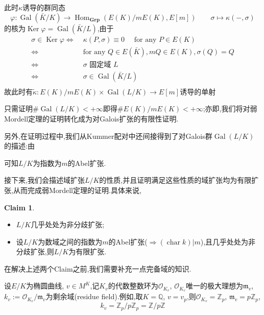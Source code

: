 \documentclass[12pt,A4paper,oneside,reqno]{amsart}
\numberwithin{equation}{section}
\theoremstyle{definition}
\newtheorem{claim}[theorem]{Claim}
\theoremstyle{plain}
\theoremstyle{plain}
\numberwithin{equation}{section}
\theoremstyle{remark}
\DeclareMathOperator{\cha}{\operatorname{char}}
\DeclareMathOperator{\Ker}{\operatorname{Ker}}
\newcommand{\Hom}{\operatorname{Hom}}
\newcommand{\Gal}{\operatorname{Gal}}
\newcommand{\Grp}{\operatorname{\textbf{Grp}}}
\begin{document}
此时$\kappa$诱导的群同态
$$\varphi:\Gal(\bar{K}/K)\longrightarrow \Hom_{\Grp}(E(K)/mE(K),E[m]) \qquad \sigma \longmapsto \kappa(-,\sigma)$$
的核为$\Ker \varphi=\Gal(\bar{K}/L)$,由于
\begin{equation*}
\begin{aligned}
\sigma \in \Ker \varphi \Longleftrightarrow\; & \kappa(P,\sigma)\equiv 0 \quad\text{ for any } P \in E(K)\\
\Longleftrightarrow\; & \text{for any }Q \in E(\bar{K}),mQ \in E(K), \sigma(Q)=Q\\
\Longleftrightarrow\; & \sigma\text{ 固定域 }L\\
\Longleftrightarrow\; & \sigma \in \Gal(\bar{K}/L)\\
\end{aligned}
\end{equation*}
故此时有$\tilde{\kappa}:E(K)/mE(K) \times \Gal (L/K) \longrightarrow E[m]$诱导的单射
	\begin{center}
	\end{center}
只需证明$\#\Gal(L/K) < +\infty$即得$\#E(K)/mE(K) < + \infty$;亦即,我们将对弱Mordell定理的证明转化成为对Galois扩张的有限性证明.

另外,在证明过程中,我们从Kummer配对中还间接得到了对Galois群$\Gal(L/K)$的描述:由
	\begin{center}
\end{center}
可知$L/K$为指数为$m$的Abel扩张.

接下来,我们会描述域扩张$L/K$的性质,并且证明满足这些性质的域扩张均为有限扩张,从而完成弱Mordell定理的证明.具体来说,
\begin{claim}\label{claim:finite}\
\begin{itemize}
	\item $L/K$几乎处处为非分歧扩张;
	\item 设$L/K$为数域之间的指数为$m$的Abel扩张($\Rightarrow (\cha  k) |m$),且几乎处处为非分歧扩张,则$L/K$为有限扩张.
\end{itemize}
\end{claim}
在解决上述两个Claim之前,我们需要补充一点完备域的知识.

	设$E/K$为椭圆曲线, $v \in M^K$,记$K_v$的代数整数环为$\mathcal{O}_{K_v}$, $\mathcal{O}_{K_v}$唯一的极大理想为$\mathfrak{m}_v$, $k_v:=\mathcal{O}_{K_v}/\mathfrak{m}_v$为剩余域(residue field).例如,取$K=\mathbb{Q}$, $v=v_p$,则$\mathcal{O}_{K_v}=\mathbb{Z}_p$, $\mathfrak{m}_v=p\mathbb{Z}_p$,
	$$k_v=\mathbb{Z}_p/p\mathbb{Z}_p=\mathbb{Z}/p\mathbb{Z}$$
	
\end{document}
